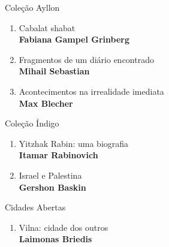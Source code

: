 \pagebreak
\pagestyle{empty}

\begingroup
\fontsize{7}{8}%

\scriptsize
{\formular\large{Coleção Ayllon}}
\begin{enumerate}
\setlength\parskip{4.2pt}
\setlength\itemsep{-1.4mm}
\item Cabalat shabat\\ \textbf{Fabiana Gampel Grinberg}
\setlength\parskip{8pt}
\item Fragmentos de um diário encontrado\\ \textbf{Mihail Sebastian}
\item Acontecimentos na irrealidade imediata\\ \textbf{Max Blecher}
\end{enumerate}

\scriptsize
{\formular\large{Coleção Índigo}}
\begin{enumerate}
\setlength\parskip{4.2pt}
\setlength\itemsep{-1.4mm}
\item Yitzhak Rabin: uma biografia\\ \textbf{Itamar Rabinovich}
\setlength\parskip{8pt}
\item Israel e Palestina\\ \textbf{Gershon Baskin}
\end{enumerate}

\scriptsize
{\formular\large{Cidades Abertas}}
\begin{enumerate}
\setlength\parskip{4.2pt}
\setlength\itemsep{-1.4mm}
\item Vilna: cidade dos outros\\ \textbf{Laimonas Briedis}
\end{enumerate}

\pagebreak